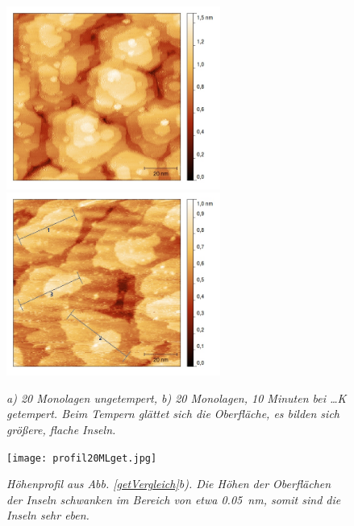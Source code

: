 \begin{figure}[htbp]
	\begin{minipage}[b]{0.5\textwidth} 
		\includegraphics[height=6cm]{20ML.jpg}
	\end{minipage}
	\hfill
	\begin{minipage}[b]{0.5\textwidth}
		\includegraphics[height=6cm]{20MLget2.jpg}
	\end{minipage}
	\caption{\textit{a) 20 Monolagen ungetempert, b) 20 Monolagen, 10 Minuten bei \ldots K getempert.
	Beim Tempern glättet sich die Oberfläche, es bilden sich größere, flache Inseln.}}
	\label{getVergleich} 
	\vfill
	\centering
		\texttt{[image: profil20MLget.jpg]}
	\caption{\textit{Höhenprofil aus Abb. \ref{getVergleich}b). Die Höhen der Oberflächen der Inseln
	schwanken im Bereich von etwa \SI{0,05}{nm}, somit sind die Inseln sehr eben.}}
	\label{profil20MLget}
\end{figure}